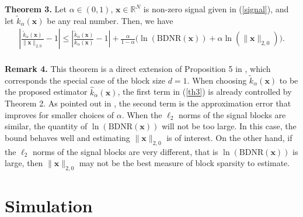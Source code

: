 \documentclass[journal,onecolumn]{IEEEtran}
\begin{document}
\noindent
{\bf Theorem 3.} Let $\alpha\in(0,1)$, $\mathbf{x}\in\mathbb{R}^N$ is non-zero signal given in (\ref{signal}), and let $\tilde{k}_{\alpha}(\mathbf{x})$ be any real number. Then, we have \begin{align}
\left|\frac{\tilde{k}_{\alpha}(\mathbf{x})}{\lVert\mathbf{x}\rVert_{2,0}}-1\right|\leq \left|\frac{\tilde{k}_{\alpha}(\mathbf{x})}{k_{\alpha}(\mathbf{x})}-1\right|+\frac{\alpha}{1-\alpha}\Big(\ln(\mathrm{BDNR}(\mathbf{x}))+\alpha\ln(\lVert\mathbf{x}\rVert_{2,0})\Big). \label{th3}
\end{align}
\\
\noindent
{\bf Remark 4.} This theorem is a direct extension of Proposition 5 in \cite{l2}, which corresponds the special case of the block size $d=1$. When choosing $\tilde{k}_{\alpha}(\mathbf{x})$ to be the proposed estimator $\hat{k}_{\alpha}(\mathbf{x})$, the first term in (\ref{th3}) is already controlled by Theorem 2. As pointed out in \cite{l2}, the second term is the approximation error that improves for smaller choices of $\alpha$. When the $\ell_2$ norms of the signal blocks are similar, the quantity of $\ln(\mathrm{BDNR}(\mathbf{x}))$ will not be too large. In this case, the bound behaves well and estimating $\lVert\mathbf{x}\rVert_{2,0}$ is of interest. On the other hand, if the $\ell_2$ norms of the signal blocks are very different, that is $\ln(\mathrm{BDNR}(\mathbf{x}))$ is large, then $\lVert\mathbf{x}\rVert_{2,0}$ may not be the best measure of block sparsity to estimate.
\section{Simulation}
\end{document}
